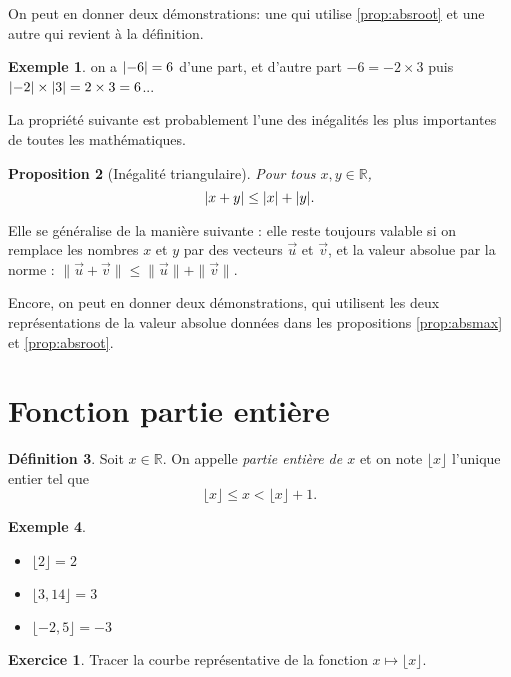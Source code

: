 \documentclass{article}
\theoremstyle{definition}
\newtheorem{mydef}{Définition}[section]
\newtheorem{exo}{Exercice}
\newtheorem{exe}[mydef]{Exemple}
\theoremstyle{remark}
\theoremstyle{plain}
\newtheorem{prop}[mydef]{Proposition}
\newcommand{\R}{\mathbb R}
\DeclarePairedDelimiter{\abs}{\lvert}{\rvert}
\begin{document}
On peut en donner deux démonstrations: une qui utilise \ref{prop:absroot} et une autre qui revient à la définition.

\begin{exe}
on a $\abs{-6} = 6$ d'une part, et d'autre part $-6 = -2\times 3$ puis $\abs{-2} \times \abs 3 = 2 \times 3 = 6$...
\end{exe}

La propriété suivante est probablement l'une des inégalités les plus importantes de toutes les mathématiques.

\begin{prop}[Inégalité triangulaire]
Pour tous $x,y\in\R$,
\begin{equation}
\abs{x+y} \leq \abs x + \abs y.
\end{equation}
\end{prop}

Elle se généralise de la manière suivante : elle reste toujours valable si on remplace les nombres $x$ et $y$ par des vecteurs $\vec u$ et $\vec v$, et la valeur absolue par la norme : $\|\vec u+\vec v\|\leq \|\vec u\| + \|\vec v\|$.

Encore, on peut en donner deux démonstrations, qui utilisent les deux représentations de la valeur absolue données dans les propositions \ref{prop:absmax} et \ref{prop:absroot}.

\section{Fonction partie entière}

\begin{mydef}
	Soit $x\in\R$. On appelle \textit{partie entière de $x$} et on note $\lfloor x\rfloor$ l'unique entier tel que
	\[ \lfloor x\rfloor \leq x < \lfloor x\rfloor + 1. \]
\end{mydef}

\begin{exe}\leavevmode
	\begin{itemize}
		\item $\lfloor 2\rfloor = 2$
		\item $\lfloor 3,14\rfloor = 3$
		\item $\lfloor -2,5\rfloor = -3$
	\end{itemize}
\end{exe}

\begin{exo}Tracer la courbe représentative de la fonction $x\longmapsto \lfloor x\rfloor$.\end{exo}
\end{document}

